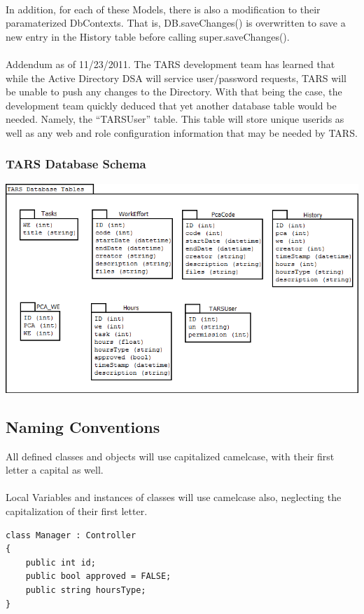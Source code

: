 \documentclass[letterpaper]{article}
\begin{document}
\\
In addition, for each of these Models, there is also a modification to their paramaterized DbContexts. That is, DB.saveChanges() is overwritten to save a new entry in the History table before calling super.saveChanges(). \\
\\
Addendum as of 11/23/2011. The TARS development team has learned that while the Active Directory DSA will service user/password requests, TARS will be unable to push any changes to the Directory. With that being the case, the development team quickly deduced that yet another database table would be needed. Namely, the ``TARSUser'' table. This table will store unique userids as well as any web and role configuration information that may be needed by TARS.

\subsubsection{TARS Database Schema}
\begin{centering}
\includegraphics[scale=0.6]{schema.png}
\end{centering}
\subsection{Naming Conventions}
All defined classes and objects will use capitalized camelcase, with their first letter a capital as well.\\
\\
Local Variables and instances of classes will use camelcase also, neglecting the capitalization of their first letter.
\begin{verbatim}
class Manager : Controller
{
    public int id;
    public bool approved = FALSE;
    public string hoursType;
}
\end{verbatim}
\end{document}
